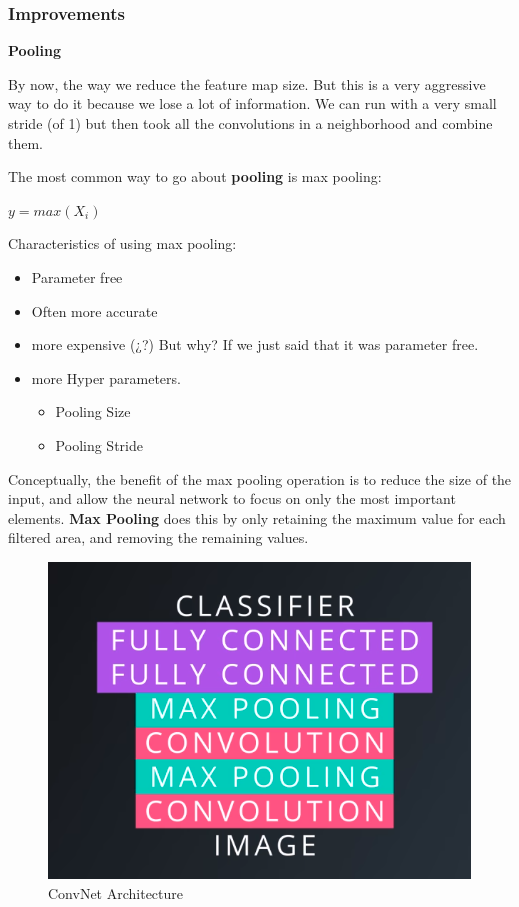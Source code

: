 \documentclass[11pt, a4paper]{article}
\begin{document}
\subsubsection{Improvements}%
\label{ssub:improvements}

\textbf{Pooling}

By now, the way we reduce the feature map size. But this is a very aggressive way to do it because we lose a lot of information. We can run with a very small stride (of 1) but then took all the convolutions in a neighborhood and combine them.

The most common way to go about \textbf{pooling} is max pooling:

$y = max(X_i)$ 

Characteristics of using max pooling:
\begin{itemize}
	\item Parameter free
	\item Often more accurate
	\item more expensive (¿?) But why? If we just said that it was parameter free.
	\item more Hyper parameters. 
		\begin{itemize}
			\item Pooling Size
			\item Pooling Stride
		\end{itemize}
\end{itemize}



Conceptually, the benefit of the max pooling operation is to reduce the size of the input, and allow the neural network to focus on only the most important elements. \textbf{Max Pooling} does this by only retaining the maximum value for each filtered area, and removing the remaining values.



\begin{figure}[htb!]
	\centering
	\includegraphics[width=0.8\linewidth]{conv_arch}
	\caption{ConvNet Architecture}
	\label{fig:conv_arch}
\end{figure}
\end{document}

